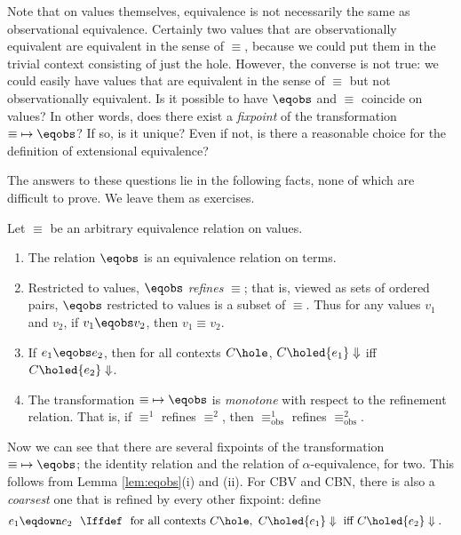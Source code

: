 Note that on values themselves, equivalence is not necessarily the same as observational equivalence. Certainly two values that are observationally equivalent are equivalent in the sense of $\equiv$, because we could put them in the trivial context consisting of just the hole. However, the converse is not true: we could easily have values that are equivalent in the sense of $\equiv$ but not observationally equivalent. Is it possible to have $\eqobs$ and $\equiv$ coincide on values? In other words,
does there exist a \emph{fixpoint} of the transformation ${\equiv}\mapsto{\eqobs}$? If so, is it unique? Even if not, is there a reasonable choice for the definition of extensional equivalence?

The answers to these questions lie in the following facts, none of which are difficult to prove.
We leave them as exercises.
\begin{lemma}
\label{lem:eqobs}
Let $\equiv$ be an arbitrary equivalence relation on values.
\begin{enumerate}
\renewcommand\labelenumi{\upshape(\roman{enumi})}
\item
The relation $\eqobs$ is an equivalence relation on terms.
\item
Restricted to values, $\eqobs$ \emph{refines} $\equiv$; that is, viewed as sets of ordered pairs, $\eqobs$ restricted to values is a subset of $\equiv$. Thus for any values $v_1$ and $v_2$, if $v_1\eqobs v_2$, then $v_1\equiv v_2$.
\item
If $e_1\eqobs e_2$, then for all contexts $C\hole$, $C\holed{e_1}\Downarrow$ iff $C\holed{e_2}\Downarrow$.
\item
The transformation ${\equiv}\mapsto{\eqobs}$ is \emph{monotone} with respect to the refinement relation. That is, if $\equiv^1$ refines $\equiv^2$, then $\equiv^1_{\mathrm{obs}}$ refines $\equiv^2_{\mathrm{obs}}$.
\end{enumerate}
\end{lemma}
Now we can see that there are several fixpoints of the transformation ${\equiv}\mapsto{\eqobs}$; the identity relation and the relation of $\alpha$-equivalence, for two. This follows from Lemma \ref{lem:eqobs}(i) and (ii). For CBV and CBN, there is also a \emph{coarsest} one that is refined by every other fixpoint: define
\begin{align*}
e_1\eqdown e_2\ \ &\Iffdef\ \ \text{for all contexts } C\hole,\ C\holed{e_1}\Downarrow \text{ iff } C\holed{e_2}\Downarrow.
\end{align*}
